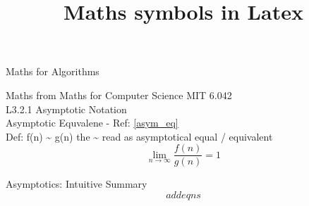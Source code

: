 \documentclass{article}		%
\title{Maths symbols in Latex}
\begin{document}
\begin{Huge}
Maths for Algorithms\\
\end{Huge}


\begin{large}
Maths from Maths for Computer Science MIT 6.042\\

L3.2.1 Asymptotic Notation\\

Asymptotic Equvalene - Ref: \ref{asym_eq}\\

Def: f(n) \~{} g(n)  {} the \~{} read as asymptotical equal / equivalent  \\  
  \begin{equation}
	\lim_{n\to\infty}\frac{f(n)}{g(n)} = 1
  	\label{asym_eq}
  \end{equation} 

Asymptotics: Intuitive Summary\\
  \begin{equation}
  add eqns
  \end{equation} 


\end{large}
\end{document}
